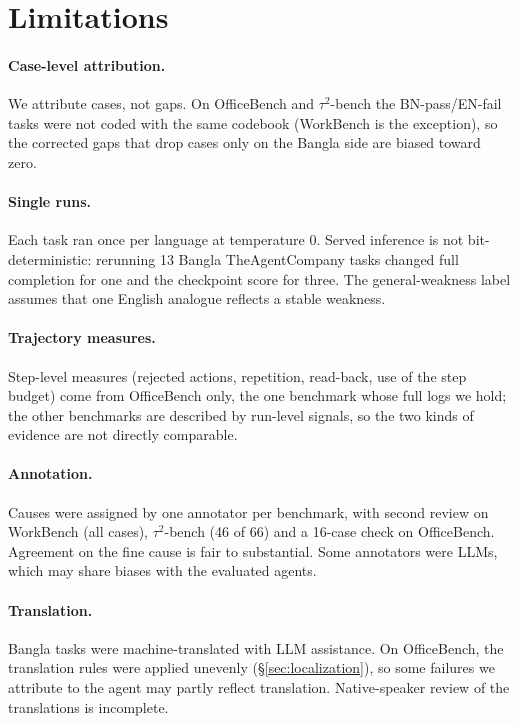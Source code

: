 \documentclass[11pt]{article}
\newcommand{\OB}{OfficeBench}
\newcommand{\WB}{WorkBench}
\newcommand{\TAU}{$\tau^2$-bench}
\newcommand{\TAC}{TheAgentCompany}
\begin{document}
\section*{Limitations}

\paragraph{Case-level attribution.} We attribute cases, not gaps. On \OB{} and \TAU{} the
BN-pass/EN-fail tasks were not coded with the same codebook (\WB{} is the exception), so the
corrected gaps that drop cases only on the Bangla side are biased toward zero.

\paragraph{Single runs.} Each task ran once per language at temperature 0. Served inference is
not bit-deterministic: rerunning 13 Bangla \TAC{} tasks changed full completion for one and the
checkpoint score for three. The
general-weakness label assumes that one English analogue reflects a stable weakness.

\paragraph{Trajectory measures.} Step-level measures (rejected actions, repetition, read-back,
use of the step budget) come from \OB{} only, the one benchmark whose full logs we hold; the other
benchmarks are described by run-level signals, so the two kinds of evidence are not directly
comparable.

\paragraph{Annotation.} Causes were assigned by one annotator per benchmark, with second review on
\WB{} (all cases), \TAU{} (46 of 66) and a 16-case check on \OB{}. Agreement on the fine cause is
fair to substantial. Some annotators were LLMs, which may share biases with the evaluated agents.

\paragraph{Translation.} Bangla tasks were machine-translated with LLM assistance. On \OB{}, the
translation rules were applied unevenly (\S\ref{sec:localization}), so some failures we attribute
to the agent may partly reflect translation. Native-speaker review of the translations is
incomplete.
\end{document}
